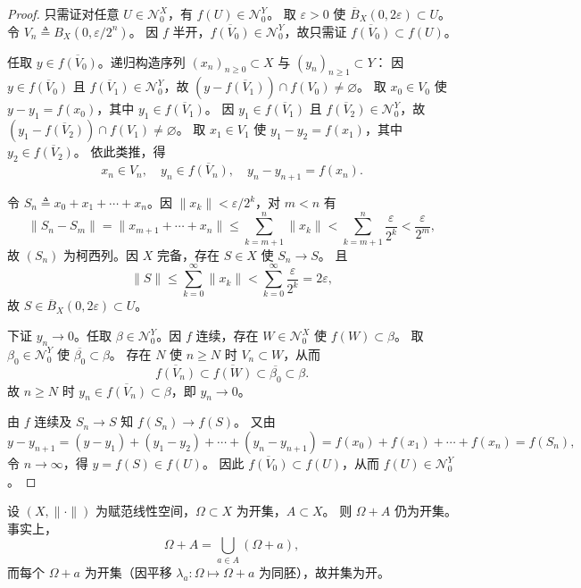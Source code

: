 \documentclass[lang=cn,a4paper,newtx,section]{elegantbook}
\begin{document}
\begin{proof}
  只需证对任意 $U\in\mathcal{N}_0^X$，有 $f(U)\in\mathcal{N}_0^Y$。
  取 $\varepsilon>0$ 使 $\overline{B}_X(0,2\varepsilon)\subset U$。
  令 $V_n\triangleq B_X(0,\varepsilon/2^n)$。
  因 $f$ 半开，$\overline{f(V_0)}\in\mathcal{N}_0^Y$，故只需证 $\overline{f(V_0)}\subset f(U)$。

  任取 $y\in\overline{f(V_0)}$。递归构造序列 $(x_n)_{n\ge 0}\subset X$ 与 $(y_n)_{n\ge 1}\subset Y$：
  因 $y\in\overline{f(V_0)}$ 且 $\overline{f(V_1)}\in\mathcal{N}_0^Y$，故 $(y-\overline{f(V_1)})\cap f(V_0)\ne\varnothing$。
  取 $x_0\in V_0$ 使 $y-y_1=f(x_0)$，其中 $y_1\in\overline{f(V_1)}$。
  因 $y_1\in\overline{f(V_1)}$ 且 $\overline{f(V_2)}\in\mathcal{N}_0^Y$，故 $(y_1-\overline{f(V_2)})\cap f(V_1)\ne\varnothing$。
  取 $x_1\in V_1$ 使 $y_1-y_2=f(x_1)$，其中 $y_2\in\overline{f(V_2)}$。
  依此类推，得
  \[
    x_n\in V_n,\quad y_n\in\overline{f(V_n)},\quad y_{n}-y_{n+1}=f(x_n).
  \]

  令 $S_n\triangleq x_0+x_1+\cdots+x_n$。因 $\|x_k\|<\varepsilon/2^k$，对 $m<n$ 有
  \[
    \|S_n-S_m\|=\|x_{m+1}+\cdots+x_n\|\le\sum_{k=m+1}^{n}\|x_k\|<\sum_{k=m+1}^{n}\frac{\varepsilon}{2^k}<\frac{\varepsilon}{2^m},
  \]
  故 $(S_n)$ 为柯西列。因 $X$ 完备，存在 $S\in X$ 使 $S_n\to S$。
  且
  \[
    \|S\|\le\sum_{k=0}^{\infty}\|x_k\|<\sum_{k=0}^{\infty}\frac{\varepsilon}{2^k}=2\varepsilon,
  \]
  故 $S\in\overline{B}_X(0,2\varepsilon)\subset U$。

  下证 $y_n\to 0$。任取 $\beta\in\mathcal{N}_0^Y$。因 $f$ 连续，存在 $W\in\mathcal{N}_0^X$ 使 $f(W)\subset\beta$。
  取 $\beta_0\in\mathcal{N}_0^Y$ 使 $\overline{\beta_0}\subset\beta$。
  存在 $N$ 使 $n\ge N$ 时 $V_n\subset W$，从而
  \[
    \overline{f(V_n)}\subset\overline{f(W)}\subset\overline{\beta_0}\subset\beta.
  \]
  故 $n\ge N$ 时 $y_n\in\overline{f(V_n)}\subset\beta$，即 $y_n\to 0$。

  由 $f$ 连续及 $S_n\to S$ 知 $f(S_n)\to f(S)$。
  又由
  \[
    y-y_{n+1}=(y-y_1)+(y_1-y_2)+\cdots+(y_n-y_{n+1})=f(x_0)+f(x_1)+\cdots+f(x_n)=f(S_n),
  \]
  令 $n\to\infty$，得 $y=f(S)\in f(U)$。
  因此 $\overline{f(V_0)}\subset f(U)$，从而 $f(U)\in\mathcal{N}_0^Y$。
\end{proof}

\begin{remark}
  设 $(X,\|\cdot\|)$ 为赋范线性空间，$\Omega\subset X$ 为开集，$A\subset X$。
  则 $\Omega+A$ 仍为开集。
  事实上，
  \[
    \Omega+A=\bigcup_{a\in A}(\Omega+a),
  \]
  而每个 $\Omega+a$ 为开集（因平移 $\lambda_a:\Omega\mapsto\Omega+a$ 为同胚），故并集为开。
\end{remark}
\end{document}
